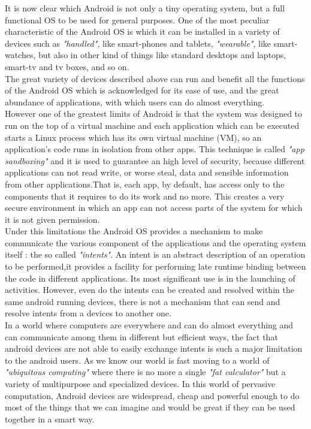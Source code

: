  It is now clear which Android is not only a tiny operating system, but a full functional OS to be used for general purposes. One of the most peculiar characteristic of the Android OS is which it can be installed in a variety of devices such as \textit{"handled"}, like smart-phones and tablets, \textit{"wearable"}, like smart-watches, but also in other kind of things like standard desktops and laptops, smart-tv and tv boxes, and so on.\\
The great variety of devices described above can run and benefit all the functions of the Android OS which is acknowledged for its ease of use, and the great abundance of applications, with which users can do almost everything. \\
However one of the greatest limits of Android is that the system was designed to run on the top of a virtual machine and each  application which can be executed starts a Linux process which has its own virtual machine (VM), so an application's code runs in isolation from other apps. This technique is called \textit{"app sandboxing"} and it is used to guarantee an high level of security, because different applications can not read write, or worse steal, data and sensible information from other applications.That is, each app, by default, has access only to the components that it requires to do its work and no more. This creates a very secure environment in which an app can not access parts of the system for which it is not given permission.\\
Under this limitations the Android OS provides a mechanism to make communicate the various component of the applications and the operating system itself : the so called \textit{"intents"}. An intent is an abstract description of an operation to be performed,it provides a facility for performing late runtime binding between the code in different applications. Its most significant use is in the launching of activities. However, even do the intents can be created and resolved within the same android running devices, there is not a mechanism that can send and resolve intents from a devices to another one.\\
In a world where computers are everywhere and can do almost everything and can communicate among them in different but efficient ways, the fact that android devices are not able to easily exchange intents is such a major limitation to the android users. As we know our world is fast moving to a world of \textit{"ubiquitous computing"} where there is no more a single \textit{"fat calculator"} but a variety of multipurpose and specialized devices. In this world of pervasive computation, Android devices are widespread, cheap and powerful enough to do most of the things that we can imagine and would be great if they can be used together in a smart way.
